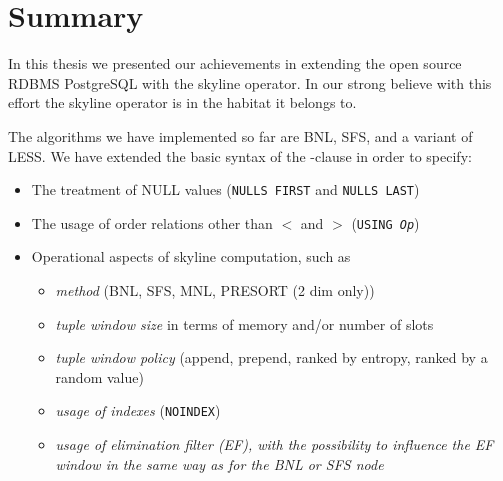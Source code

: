 %






\chapter{Summary}
\label{chap:summary}

In this thesis we presented our achievements in extending the open source
RDBMS PostgreSQL with the skyline operator.  In our strong believe with
this effort the skyline operator is in the habitat it belongs to.

The algorithms we have implemented so far are BNL, SFS, and a variant
of LESS.  
We have extended the basic syntax of the -clause
\citep{Borzsonyi2001} in order to specify:

\begin{itemize}
\item The treatment of NULL values (\texttt{NULLS FIRST} and \texttt{NULLS LAST})
\item The usage of order relations other than $<$ and $>$ (\texttt{USING \emph{Op}})
\item Operational aspects of skyline computation, such as 
\begin{itemize}
\item \emph{method} (BNL, SFS, MNL, PRESORT (2 dim only))
\item \emph{tuple window size} in terms of memory and/or number of slots
\item \emph{tuple window policy} (append, prepend, ranked by entropy, ranked by a random value)
\item \emph{usage of indexes} (\texttt{NOINDEX})
\item \emph{usage of elimination filter (EF), 
  	with the possibility to influence the EF window in the same way
  	as for the BNL or SFS node}
\end{itemize}
\end{itemize}

